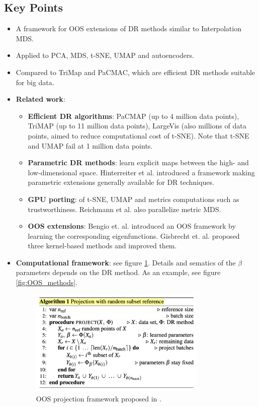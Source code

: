 \documentclass[a4paper,12pt]{article}
\begin{document}
\subsection{Key Points}

\begin{itemize}
    \item A framework for OOS extensions of DR methods similar to Interpolation MDS.
    \item Applied to PCA, MDS, t-SNE, UMAP and autoencoders.
    \item Compared to TriMap and PaCMAC, which are efficient DR methods suitable for big data.
    \item \textbf{Related work}:
    \begin{itemize}
        \item \textbf{Efficient DR algorithms}: PaCMAP (up to 4 million data points), TriMAP (up to 11 million data points), LargeVis (also millions of data points, aimed to reduce computational cost of t-SNE). Note that t-SNE and UMAP fail at 1 million data points.
        \item \textbf{Parametric DR methods}: learn explicit maps between the high- and low-dimensional space.  Hinterreiter et al. \cite{ParaDime} introduced a framework making parametric extensions generally available for DR techniques.
        \item \textbf{GPU porting}: of t-SNE, UMAP and metrics computations such as trustworthiness. Reichmann et al. also parallelize metric MDS.
        \item \textbf{OOS extensions}: Bengio et. al. \cite{Bengio2003OOS} introduced an OOS framework by learning the corresponding eigenfunctions. Gisbrecht et. al. \cite{Gisbrecht2012OutofsampleKE} proposed three kernel-based methods and \cite{Zhang2021OOS} improved them.
    \end{itemize}
    \item \textbf{Computational framework}: see figure \ref{fig:OOS_algorithm}. Details and sematics of the $\beta$ parameters depends on the DR method. As an example, see figure \ref{fig:OOS_methods}.
    
    \begin{figure}[ht]
        \centering
        \includegraphics[width=0.8\textwidth]{figures/OOS_algorithm.png}
        \caption{OOS projection framework proposed in \cite{reichmann2024outofcoredimensionalityreductionlarge}.}
        \label{fig:OOS_algorithm}
    \end{figure}


\end{itemize}
\end{document}
